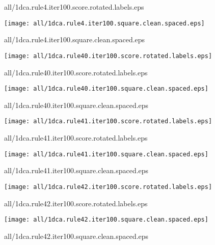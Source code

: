 \documentclass{article}
\begin{document}
{\footnotesize all/1dca.rule4.iter100.score.rotated.labels.eps}
\begin{center}
\begin{minipage}{\textwidth}
\texttt{[image: all/1dca.rule4.iter100.square.clean.spaced.eps]}
\end{minipage}
\end{center}
{\footnotesize all/1dca.rule4.iter100.square.clean.spaced.eps}
\begin{center}
\begin{minipage}{\textwidth}
\texttt{[image: all/1dca.rule40.iter100.score.rotated.labels.eps]}
\end{minipage}
\end{center}
{\footnotesize all/1dca.rule40.iter100.score.rotated.labels.eps}
\begin{center}
\begin{minipage}{\textwidth}
\texttt{[image: all/1dca.rule40.iter100.square.clean.spaced.eps]}
\end{minipage}
\end{center}
{\footnotesize all/1dca.rule40.iter100.square.clean.spaced.eps}
\begin{center}
\begin{minipage}{\textwidth}
\texttt{[image: all/1dca.rule41.iter100.score.rotated.labels.eps]}
\end{minipage}
\end{center}
{\footnotesize all/1dca.rule41.iter100.score.rotated.labels.eps}
\begin{center}
\begin{minipage}{\textwidth}
\texttt{[image: all/1dca.rule41.iter100.square.clean.spaced.eps]}
\end{minipage}
\end{center}
{\footnotesize all/1dca.rule41.iter100.square.clean.spaced.eps}
\begin{center}
\begin{minipage}{\textwidth}
\texttt{[image: all/1dca.rule42.iter100.score.rotated.labels.eps]}
\end{minipage}
\end{center}
{\footnotesize all/1dca.rule42.iter100.score.rotated.labels.eps}
\begin{center}
\begin{minipage}{\textwidth}
\texttt{[image: all/1dca.rule42.iter100.square.clean.spaced.eps]}
\end{minipage}
\end{center}
{\footnotesize all/1dca.rule42.iter100.square.clean.spaced.eps}
\end{document}
